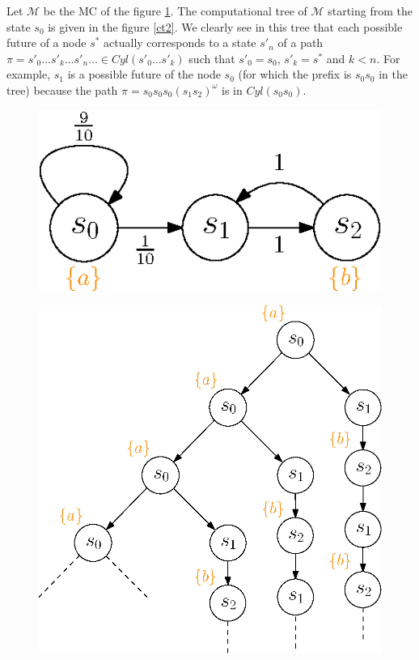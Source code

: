 \begin{example}
Let $\mathcal{M}$ be the MC of the figure \ref{ct1}. The computational tree of $\mathcal{M}$ starting from the state $s_0$ is
given in the figure \ref{ct2}. We clearly see in this tree that each possible future of a node $s^*$ actually corresponds to a state $s'_n$ of a path $\pi = s'_0 \dots s'_k \dots s'_n \dots \in Cyl(s'_0 \dots s'_k)$ such that $s'_0 = s_0$, $s'_k=s^*$ and $k < n$.
For example, $s_1$ is a possible future of the node $s_0$ (for which the prefix is $s_0s_0$ in the tree) because the path $\pi = s_0s_0s_0(s_1s_2)^\omega$ is in $Cyl(s_0s_0)$.
\begin{figure}[h]
  \begin{minipage}{0.4\linewidth}
    \centering
    \includegraphics[width=0.8\linewidth]{resources/CLT_unfolding_1}
    \captionsetup{justification=centering}
    \label{ct1}
  \end{minipage}
  \begin{minipage}{0.6\linewidth}
    \centering
    \includegraphics[width=0.8\linewidth]{resources/CLT_unfolding_2}

\end{minipage}
\end{figure}
\end{example}
